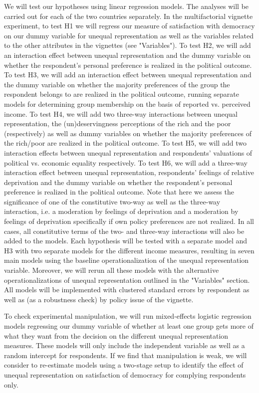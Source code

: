 \documentclass[12pt, letterpaper]{article}
\begin{document}
\begin{spacing}{1.5}
We will test our hypotheses using linear regression models. The analyses will be carried out for each of the two countries separately.
In the multifactorial vignette experiment, to test H1 we will regress our measure of satisfaction with democracy on our dummy variable for unequal representation as well as the variables related to the other attributes in the vignettes (see "Variables"). To test H2, we will add an interaction effect between unequal representation and the dummy variable on whether the respondent's personal preference is realized in the political outcome. To test H3, we will add an interaction effect between unequal representation and the dummy variable on whether the majority preferences of the group the respondent belongs to are realized in the political outcome, running separate models for determining group membership on the basis of reported vs. perceived income. To test H4, we will add two three-way interactions between unequal representation, the (un)deservingness perceptions of the rich and the poor (respectively) as well as dummy variables on whether the majority preferences of the rich/poor are realized in the political outcome. To test H5, we will add two interaction effects between unequal representation and respondents' valuations of political vs. economic equality respectively. To test H6, we will add a three-way interaction effect between unequal representation, respondents' feelings of relative deprivation and the dummy variable on whether the respondent's personal preference is realized in the political outcome. Note that here we assess the significance of one of the constitutive two-way as well as the three-way interaction, i.e. a moderation by feelings of deprivation and a moderation by feelings of deprivation specifically if own policy preferences are not realized. In all cases, all constitutive terms of the two- and three-way interactions will also be added to the models. Each hypothesis will be tested with a separate model and H3 with two separate models for the different income measures, resulting in seven main models using the baseline operationalization of the unequal representation variable. Moreover, we will rerun all these models with the alternative operationalizations of unequal representation outlined in the "Variables" section. All models will be implemented with clustered standard errors by respondent as well as (as a robustness check) by policy issue of the vignette.

To check experimental manipulation, we will run mixed-effects logistic regression models regressing our dummy variable of whether at least one group gets more of what they want from the decision on the different unequal representation measures. These models will only include the independent variable as well as a random intercept for respondents. If we find that manipulation is weak, we will consider to re-estimate models using a two-stage setup to identify the effect of unequal representation on satisfaction of democracy for complying respondents only.


\end{spacing}
\end{document}
